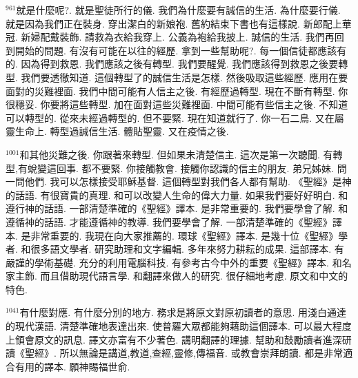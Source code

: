 \documentclass{book}
\begin{document}
$^{961}$就是什麼呢?.
就是聖徒所行的儀.
我們為什麼要有誠信的生活.
為什麼要行儀.
就是因為我們正在裝身.
穿出潔白的新娘袍.
舊約結束下書也有這樣說.
新郎配上華冠.
新婦配戴裝飾.
請救為衣給我穿上.
公義為袍給我披上.
誠信的生活.
我們再回到開始的問題.
有沒有可能在以往的經歷.
拿到一些幫助呢?.
每一個信徒都應該有的.
因為得到救恩.
我們應該之後有轉型.
我們要醒覺.
我們應該得到救恩之後要轉型.
我們要透徹知道.
這個轉型了的誠信生活是怎樣.
然後吸取這些經歷.
應用在要面對的災難裡面.
我們中間可能有人信主之後.
有經歷過轉型.
現在不斷有轉型.
你很穩妥.
你要將這些轉型.
加在面對這些災難裡面.
中間可能有些信主之後.
不知道可以轉型的.
從來未經過轉型的.
但不要緊.
現在知道就行了.
你一石二鳥.
又在屬靈生命上.
轉型過誠信生活.
體貼聖靈.
又在疫情之後.

$^{1001}$和其他災難之後.
你跟著來轉型.
但如果未清楚信主.
這次是第一次聽聞.
有轉型,有蛻變這回事.
都不要緊.
你接觸教會.
接觸你認識的信主的朋友.
弟兄姊妹.
問一問他們.
我可以怎樣接受耶穌基督.
這個轉型對我們各人都有幫助.
《聖經》是神的話語.
有很寶貴的真理.
和可以改變人生命的偉大力量.
如果我們要好好明白.
和遵行神的話語.
一部清楚準確的《聖經》譯本.
是非常重要的.
我們要學會了解.
和遵循神的話語.
才能遵循神的教導.
我們要學會了解.
一部清楚準確的《聖經》譯本.
是非常重要的.
我現在向大家推薦的.
環球《聖經》譯本.
是幾十位《聖經》學者.
和很多語文學者.
研究助理和文字編輯.
多年來努力耕耘的成果.
這部譯本.
有嚴謹的學術基礎.
充分的利用電腦科技.
有參考古今中外的重要《聖經》譯本.
和名家主飾.
而且借助現代語言學.
和翻譯來做人的研究.
很仔細地考慮.
原文和中文的特色.

$^{1041}$有什麼對應.
有什麼分別的地方.
務求是將原文對原初讀者的意思.
用淺白通達的現代漢語.
清楚準確地表達出來.
使普羅大眾都能夠藉助這個譯本.
可以最大程度上領會原文的訊息.
譯文亦富有不少著色.
講明翻譯的理據.
幫助和鼓勵讀者進深研讀《聖經》.
所以無論是講道,教道,查經,靈修,傳福音.
或教會崇拜朗讀.
都是非常適合有用的譯本.
願神賜福世俞.
\newpage
\end{document}
